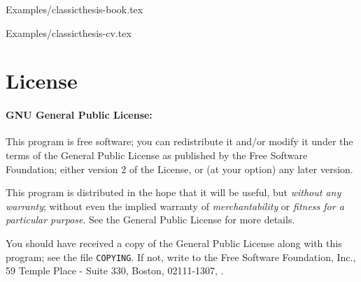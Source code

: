 %
    {Examples/classicthesis-book.tex}

%
    {Examples/classicthesis-cv.tex}


\section{License}
\paragraph{GNU General Public License:} This program is free software;
    you can redistribute it and/or modify
    it under the terms of the  General Public License as
    published by
    the Free Software Foundation; either version 2 of the License, or
    (at your option) any later version.

    This program is distributed in the hope that it will be useful,
    but \emph{without any warranty}; without even the implied warranty of
    \emph{merchantability} or \emph{fitness for a particular purpose}.
    See the
     General Public License for more details.

    You should have received a copy of the  General
    Public License
    along with this program; see the file \texttt{COPYING}. If not,
    write to
    the Free Software Foundation, Inc., 59 Temple Place - Suite 330,
    Boston,  02111-1307, .





